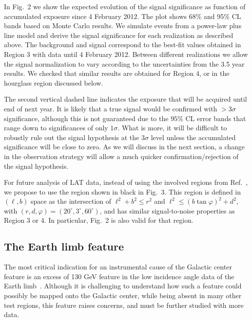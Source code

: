 \documentclass[aps,prd,superscriptaddress,showpacs,nofootinbib,fixlfloat, 12pt]{revtex4-1}
\begin{document}
In Fig.~2 we show the expected evolution of the signal significance as
function of accumulated exposure since 4 February 2012. The plot shows 68\%
and 95\% CL bands based on Monte Carlo results. We simulate events from a
power-law plus line model and derive the signal significance for each
realization as described above. The background and signal correspond to the
best-fit values obtained in Region 3 with data until 4 February 2012.  Between
different realizations we allow the signal normalization to vary according to
the uncertainties from the 3.5 year results. We checked that similar results
are obtained for Region 4, or in the hourglass region discussed below.

The second vertical dashed line indicates the exposure that will be acquired
until end of next year. It is likely that a true signal would be confirmed
with $>3\sigma$ significance, although this is not guaranteed due to the
$95\%$ CL error bands that range down to significances of only $1\sigma$. What
is more, it will be difficult to robustly rule out the signal hypothesis at
the $3\sigma$ level unless the accumulated significance will be close to zero.
As we will discuss in the next section, a change in the observation strategy
will allow a much quicker confirmation/rejection of the signal hypothesis.

\medskip
For future analysis of LAT data, instead of using the involved regions from
Ref.~\cite{Weniger:2012}, we propose to use the region shown in black in
Fig.~3. This region is defined in $(\ell, b)$ space as the intersection of
$\ell^2+b^2\leq r^2$ and $\ell^2\leq (b\tan\varphi)^2 + d^2$, with $(r,
d, \varphi) = (20^\circ, 3^\circ, 60^\circ)$, and has similar signal-to-noise
properties as Region 3 or 4. In particular, Fig.~2 is also valid for that
region.

\subsection{The Earth limb feature}
The most critical indication for an instrumental cause of the Galactic center
feature is an excess of 130 GeV feature in the low incidence angle data of
the Earth limb~\cite{linepaper, finkbeiner_systematics, Hektor:2012ev,
bloom_charles_fermi_lat_line}. Although it is challenging to understand how
such a feature could possibly be mapped onto the Galactic center, while being
absent in many other test regions, this feature raises concerns, and must be
further studied with more data.
\end{document}
